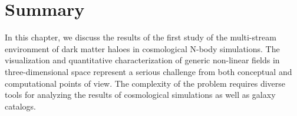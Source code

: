 


\section{Summary}
In this chapter, we discuss the results of the first study of the multi-stream environment of dark matter haloes in cosmological N-body simulations.
The visualization and quantitative characterization of generic non-linear fields in three-dimensional space represent a serious
challenge from both conceptual and computational points of view. The complexity of the problem requires diverse tools
for analyzing the results of cosmological simulations as well as galaxy catalogs.




